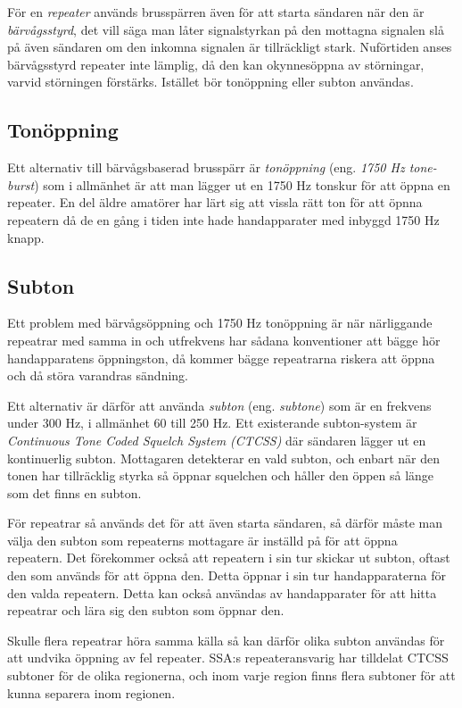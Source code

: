 För en \emph{repeater} används brusspärren även för att starta sändaren när den
är \emph{bärvågsstyrd}, det vill säga man låter signalstyrkan på den mottagna signalen
slå på även sändaren om den inkomna signalen är tillräckligt stark.
Nuförtiden anses bärvågsstyrd repeater inte lämplig, då den kan okynnesöppna av
störningar, varvid störningen förstärks.
Istället bör tonöppning eller subton användas.

\subsection{Tonöppning}

Ett alternativ till bärvågsbaserad brusspärr är \emph{tonöppning} (eng.
\emph{1750 Hz tone-burst}) som i allmänhet är att man lägger ut en 1750 Hz
tonskur för att öppna en repeater.
En del äldre amatörer har lärt sig att vissla rätt ton för att öpnna repeatern
då de en gång i tiden inte hade handapparater med inbyggd 1750 Hz knapp.

\subsection{Subton}

Ett problem med bärvågsöppning och 1750 Hz tonöppning är när närliggande
repeatrar med samma in och utfrekvens har sådana konventioner att bägge hör
handapparatens öppningston, då kommer bägge repeatrarna riskera att öppna och
då störa varandras sändning.

Ett alternativ är därför att använda \emph{subton} (eng. \emph{subtone}) som är
en frekvens under 300 Hz, i allmänhet 60 till 250 Hz.
Ett existerande subton-system är \emph{Continuous Tone Coded Squelch System
  (CTCSS)} där sändaren lägger ut en kontinuerlig subton.
Mottagaren detekterar en vald subton, och enbart när den tonen har tillräcklig
styrka så öppnar squelchen och håller den öppen så länge som det finns en
subton.

För repeatrar så används det för att även starta sändaren, så därför måste man
välja den subton som repeaterns mottagare är inställd på för att öppna
repeatern.
Det förekommer också att repeatern i sin tur skickar ut subton, oftast den som
används för att öppna den.
Detta öppnar i sin tur handapparaterna för den valda repeatern.
Detta kan också användas av handapparater för att hitta repeatrar och lära sig
den subton som öppnar den.

Skulle flera repeatrar höra samma källa så kan därför olika subton användas
för att undvika öppning av fel repeater.
SSA:s repeateransvarig har tilldelat CTCSS subtoner för de olika regionerna,
och inom varje region finns flera subtoner för att kunna separera inom
regionen.


